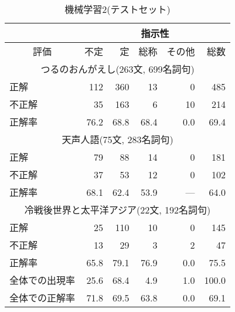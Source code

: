 \begin{table}[t]
\small

\caption{機械学習2(テストセット)}\label{tab:turu_m2}

\begin{center}


{

\begin{tabular}[c]{|l|r|r|r|r|r|} \hline
 & \multicolumn{5}{|c|}{指示性}  \\ \hline 
\multicolumn{1}{|c|}{評価}  &  不定  &  定    &  総称 &  その他 &   総数   \\ \hline 
\multicolumn{6}{|c|}{つるのおんがえし(263文, 699名詞句)} \\ \hline 
   正解   &     112  &     360  &      13  &       0  &     485   \\
  不正解  &      35  &     163  &       6  &      10  &     214   \\\hline
  正解率  &   76.2  &   68.8  &   68.4  &    0.0  &   69.4   \\\hline
\multicolumn{6}{|c|}{天声人語(75文, 283名詞句)} \\ \hline 
   正解   &      79  &      88  &      14  &       0  &     181   \\
  不正解  &      37  &      53  &      12  &       0  &     102   \\\hline
  正解率  &   68.1  &   62.4  &   53.9  &     ---  &   64.0   \\\hline
\multicolumn{6}{|c|}{冷戦後世界と太平洋アジア(22文, 192名詞句)} \\\hline 
   正解   &      25  &     110  &      10  &       0  &     145   \\
  不正解  &      13  &      29  &       3  &       2  &      47   \\\hline
  正解率  &   65.8  &   79.1  &   76.9  &    0.0  &   75.5   \\\hline
全体での出現率 &  25.6  &  68.4 &  4.9    &  1.0   &  100.0 \\
全体での正解率  &   71.8  &   69.5  &   63.8  &    0.0  &   69.1   \\\hline
\end{tabular}
}
\end{center}
\end{table}

